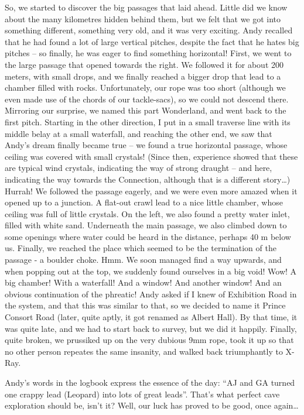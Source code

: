 So, we started to discover the big passages that laid ahead. Little did
we know about the many kilometres hidden behind them, but we felt that
we got into something different, something very old, and it was very
exciting. Andy recalled that he had found a lot of large vertical
pitches, despite the fact that he hates big pitches -- so finally, he
was eager to find something horizontal! First, we went to the large
passage that opened towards the right. We followed it for about 200
meters, with small drops, and we finally reached a bigger drop that lead
to a chamber filled with rocks. Unfortunately, our rope was too short
(although we even made use of the chords of our tackle-sacs), so we
could not descend there. Mirroring our surprise, we named this part
Wonderland, and went back to the first pitch. Starting in the other
direction, I put in a small traverse line with its middle belay at a
small waterfall, and reaching the other end, we saw that Andy's dream
finally became true -- we found a true horizontal passage, whose ceiling
was covered with small crystals! (Since then, experience showed that
these are typical wind crystals, indicating the way of strong draught --
and here, indicating the way towards the Connection, although that is a
different story\ldots{}) Hurrah! We followed the passage eagerly, and we
were even more amazed when it opened up to a junction. A flat-out crawl
lead to a nice little chamber, whose ceiling was full of little
crystals. On the left, we also found a pretty water inlet, filled with
white sand. Underneath the main passage, we also climbed down to some
openings where water could be heard in the distance, perhaps 40 m below
us. Finally, we reached the place which seemed to be the termination of
the passage - a boulder choke. Hmm. We soon managed find a way upwards,
and when popping out at the top, we suddenly found ourselves in a big
void! Wow! A big chamber! With a waterfall! And a window! And another
window! And an obvious continuation of the phreatic! Andy asked if I
knew of Exhibition Road in the system, and that this was similar to
that, so we decided to name it Prince Consort Road (later, quite aptly,
it got renamed as Albert Hall). By that time, it was quite late, and we
had to start back to survey, but we did it happily. Finally, quite
broken, we prussiked up on the very dubious 9mm rope, took it up so that
no other person repeates the same insanity, and walked back triumphantly
to X-Ray.

Andy's words in the logbook express the essence of the day: ``AJ and GA
turned one crappy lead (Leopard) into lots of great leads''. That's what
perfect cave exploration should be, isn't it? Well, our luck has proved
to be good, once again\ldots{}

